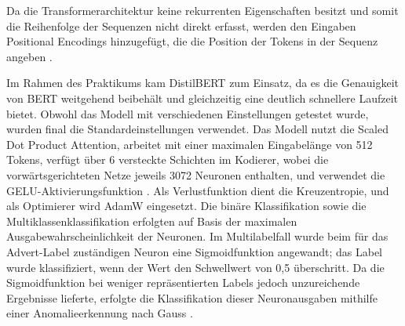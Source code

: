 Da die Transformerarchitektur keine rekurrenten Eigenschaften besitzt und somit die Reihenfolge der Sequenzen nicht direkt erfasst, werden den Eingaben Positional Encodings hinzugefügt, die die Position der Tokens in der Sequenz angeben \cite{Song2020} \cite{Sennrich2015} \cite{Schuster2012}.

Im Rahmen des Praktikums kam DistilBERT \cite{Sanh2019} zum Einsatz, da es die Genauigkeit von BERT weitgehend beibehält und gleichzeitig eine deutlich schnellere Laufzeit bietet. Obwohl das Modell mit verschiedenen Einstellungen getestet wurde, wurden final die Standardeinstellungen verwendet. Das Modell nutzt die Scaled Dot Product Attention, arbeitet mit einer maximalen Eingabelänge von 512 Tokens, verfügt über 6 versteckte Schichten im Kodierer, wobei die vorwärtsgerichteten Netze jeweils 3072 Neuronen enthalten, und verwendet die GELU-Aktivierungsfunktion \cite{Hendrycks2016}. Als Verlustfunktion dient die Kreuzentropie, und als Optimierer wird AdamW eingesetzt. Die binäre Klassifikation sowie die Multiklassenklassifikation erfolgten auf Basis der maximalen Ausgabewahrscheinlichkeit der Neuronen. Im Multilabelfall wurde beim für das Advert-Label zuständigen Neuron eine Sigmoidfunktion angewandt; das Label wurde klassifiziert, wenn der Wert den Schwellwert von 0,5 überschritt. Da die Sigmoidfunktion bei weniger repräsentierten Labels jedoch unzureichende Ergebnisse lieferte, erfolgte die Klassifikation dieser Neuronausgaben mithilfe einer Anomalieerkennung nach Gauss \cite{Mitchell2013}.
